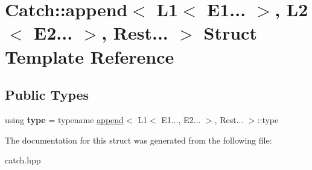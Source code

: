\hypertarget{structCatch_1_1append_3_01L1_3_01E1_8_8_8_01_4_00_01L2_3_01E2_8_8_8_01_4_00_01Rest_8_8_8_01_4}{}\section{Catch\+::append$<$ L1$<$ E1... $>$, L2$<$ E2... $>$, Rest... $>$ Struct Template Reference}
\label{structCatch_1_1append_3_01L1_3_01E1_8_8_8_01_4_00_01L2_3_01E2_8_8_8_01_4_00_01Rest_8_8_8_01_4}
\subsection*{Public Types}
\begin{DoxyCompactItemize}
\item 
\mbox{\label{structCatch_1_1append_3_01L1_3_01E1_8_8_8_01_4_00_01L2_3_01E2_8_8_8_01_4_00_01Rest_8_8_8_01_4_ab3448b6c1403a945f939d6ae6c5b39f2}} 
using {\bfseries type} = typename \mbox{\hyperlink{structCatch_1_1append}{append}}$<$ L1$<$ E1..., E2... $>$, Rest... $>$\+::type
\end{DoxyCompactItemize}


The documentation for this struct was generated from the following file\+:\begin{DoxyCompactItemize}
\item 
catch.\+hpp\end{DoxyCompactItemize}
